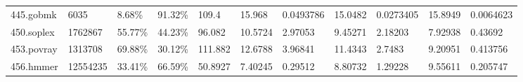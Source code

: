 \documentclass[11pt]{article}
\begin{document}
\begin{landscape}
\begin{table}
\begin{tabular}{lllllllllll}
445.gobmk                                                                                 & 6035                                                                                         & 8.68\%                                                                                          & 91.32\%                                                                                          & 109.4                                                                                            & 15.968                            & 0.0493786                         & 15.0482                           & 0.0273405                         & 15.8949                           & 0.0064623                         \\
450.soplex                                                                                & 1762867                                                                                      & 55.77\%                                                                                         & 44.23\%                                                                                          & 96.082                                                                                           & 10.5724                           & 2.97053                           & 9.45271                           & 2.18203                           & 7.92938                           & 0.43692                           \\
453.povray                                                                                & 1313708                                                                                      & 69.88\%                                                                                         & 30.12\%                                                                                          & 111.882                                                                                          & 12.6788                           & 3.96841                           & 11.4343                           & 2.7483                            & 9.20951                           & 0.413756                          \\
456.hmmer                                                                                 & 12554235                                                                                     & 33.41\%                                                                                         & 66.59\%                                                                                          & 50.8927                                                                                          & 7.40245                           & 0.29512                           & 8.80732                           & 1.29228                           & 9.55611                           & 0.205747                          \\

\end{tabular}
\end{table}
\end{landscape}
\end{document}
